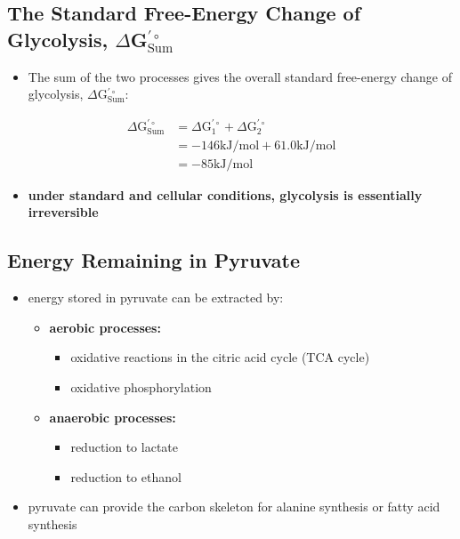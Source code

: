 \documentclass[10pt]{article}
\begin{document}
\subsection*{The Standard Free-Energy Change of Glycolysis, $\Delta$G$^{'\circ}_{\text{Sum}}$}
\begin{itemize}
	\item The sum of the two processes gives the overall standard free-energy change of glycolysis, $\Delta$G$^{'\circ}_{\text{Sum}}$:
\end{itemize}
\begin{align*}
    \Delta \text{G}^{'\circ}_{\text{Sum}} &= \Delta \text{G}^{'\circ}_1 + \Delta \text{G}^{'\circ}_2\\
    &= -146 \text{kJ/mol} + 61.0 \text{kJ/mol}\\
    &= -85 \text{kJ/mol}
\end{align*}
\begin{itemize}
    \item \textbf{under standard and cellular conditions, glycolysis is essentially irreversible}
\end{itemize}

\subsection*{Energy Remaining in Pyruvate}
\begin{itemize}
	\item energy stored in pyruvate can be extracted by:
	\begin{itemize}
        \item \textbf{aerobic processes:}
        \begin{itemize}
            \item oxidative reactions in the citric acid cycle (TCA cycle)
            \item oxidative phosphorylation
        \end{itemize}
        \item \textbf{anaerobic processes:}
        \begin{itemize}
            \item reduction to lactate
            \item reduction to ethanol
        \end{itemize}
    \end{itemize}
    \item pyruvate can provide the carbon skeleton for alanine synthesis or fatty acid synthesis
\end{itemize}
\end{document}
